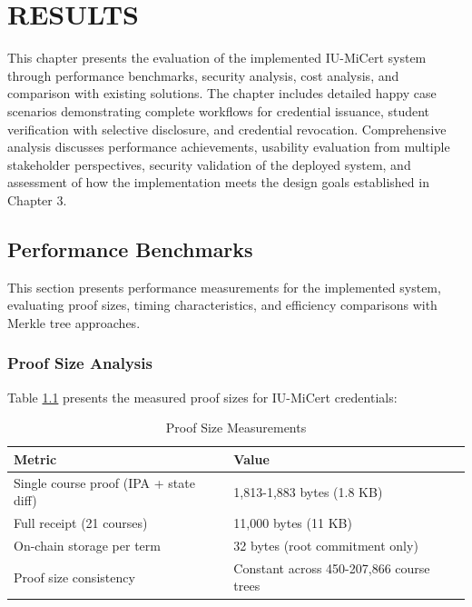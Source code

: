 \chapter{RESULTS}
\label{ch:results}

This chapter presents the evaluation of the implemented IU-MiCert system through performance benchmarks, security analysis, cost analysis, and comparison with existing solutions. The chapter includes detailed happy case scenarios demonstrating complete workflows for credential issuance, student verification with selective disclosure, and credential revocation. Comprehensive analysis discusses performance achievements, usability evaluation from multiple stakeholder perspectives, security validation of the deployed system, and assessment of how the implementation meets the design goals established in Chapter 3.

\section{Performance Benchmarks}
\label{sec:performance-benchmarks}

This section presents performance measurements for the implemented system, evaluating proof sizes, timing characteristics, and efficiency comparisons with Merkle tree approaches.

\subsection{Proof Size Analysis}
\label{subsec:proof-size}

Table \ref{tab:proof-sizes} presents the measured proof sizes for IU-MiCert credentials:

\begin{table}[H]
\centering
\caption{Proof Size Measurements}
\label{tab:proof-sizes}
\begin{tabular}{|p{6cm}|p{6cm}|}
\hline
\textbf{Metric} & \textbf{Value} \\
\hline
Single course proof (IPA + state diff) & 1,813-1,883 bytes (1.8 KB) \\
\hline
Full receipt (21 courses) & 11,000 bytes (11 KB) \\
\hline
On-chain storage per term & 32 bytes (root commitment only) \\
\hline
Proof size consistency & Constant across 450-207,866 course trees \\
\hline
\end{tabular}
\end{table}

